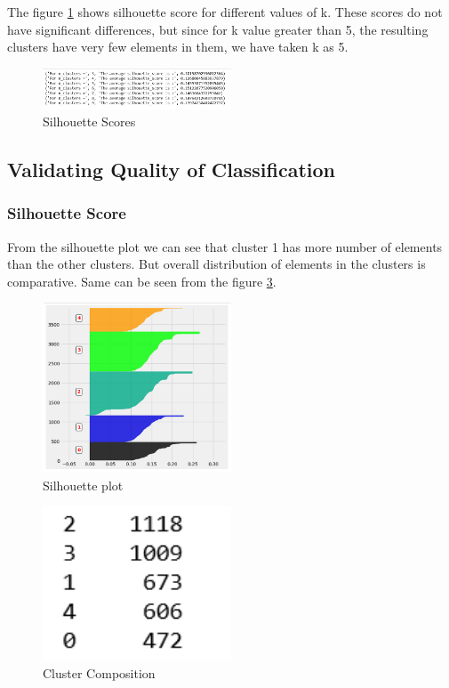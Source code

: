 The figure \ref{3.2} shows silhouette score for different values of k. These scores do not have significant differences, but since for k value greater than 5, the resulting clusters have very few elements in them, we have taken k as 5. 

\begin{figure}[H]
\caption{Silhouette Scores}
\label{3.2}
\centering
\includegraphics[width=0.5\textwidth]{images/3_2.PNG}
\end{figure}

\subsection{Validating Quality of Classification}

\subsubsection{Silhouette  Score}

From the silhouette plot we can see that cluster 1 has more number of elements than the other clusters. But overall distribution of elements in the clusters is comparative. Same can be seen from the figure \ref{3.4}.

\begin{figure}[H]
\caption{Silhouette plot}
\label{3.3}
\centering
\includegraphics[width=0.5\textwidth]{images/3_3.PNG}
\end{figure}

\begin{figure}[H]
\caption{Cluster Composition}
\label{3.4}
\centering
\includegraphics[width=0.5\textwidth]{images/3_4.PNG}
\end{figure}

